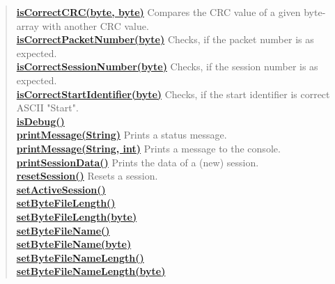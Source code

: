 {{{{{\begin{verse}
\hyperlink{filetransferUDP.FileTransfer.isCorrectCRC(byte[], byte[])}{{\bf isCorrectCRC(byte\lbrack \rbrack , byte\lbrack \rbrack )}} Compares the CRC value of a given byte-array with another CRC value.\\
\hyperlink{filetransferUDP.FileTransfer.isCorrectPacketNumber(byte)}{{\bf isCorrectPacketNumber(byte)}} Checks, if the packet number is as expected.\\
\hyperlink{filetransferUDP.FileTransfer.isCorrectSessionNumber(byte[])}{{\bf isCorrectSessionNumber(byte\lbrack \rbrack )}} Checks, if the session number is as expected.\\
\hyperlink{filetransferUDP.FileTransfer.isCorrectStartIdentifier(byte[])}{{\bf isCorrectStartIdentifier(byte\lbrack \rbrack )}} Checks, if the start identifier is correct ASCII "Start".\\
\hyperlink{filetransferUDP.FileTransfer.isDebug()}{{\bf isDebug()}} \\
\hyperlink{filetransferUDP.FileTransfer.printMessage(java.lang.String)}{{\bf printMessage(String)}} Prints a status message.\\
\hyperlink{filetransferUDP.FileTransfer.printMessage(java.lang.String, int)}{{\bf printMessage(String, int)}} Prints a message to the console.\\
\hyperlink{filetransferUDP.FileTransfer.printSessionData()}{{\bf printSessionData()}} Prints the data of a (new) session.\\
\hyperlink{filetransferUDP.FileTransfer.resetSession()}{{\bf resetSession()}} Resets a session.\\
\hyperlink{filetransferUDP.FileTransfer.setActiveSession()}{{\bf setActiveSession()}} \\
\hyperlink{filetransferUDP.FileTransfer.setByteFileLength()}{{\bf setByteFileLength()}} \\
\hyperlink{filetransferUDP.FileTransfer.setByteFileLength(byte[])}{{\bf setByteFileLength(byte\lbrack \rbrack )}} \\
\hyperlink{filetransferUDP.FileTransfer.setByteFileName()}{{\bf setByteFileName()}} \\
\hyperlink{filetransferUDP.FileTransfer.setByteFileName(byte[])}{{\bf setByteFileName(byte\lbrack \rbrack )}} \\
\hyperlink{filetransferUDP.FileTransfer.setByteFileNameLength()}{{\bf setByteFileNameLength()}} \\
\hyperlink{filetransferUDP.FileTransfer.setByteFileNameLength(byte[])}{{\bf setByteFileNameLength(byte\lbrack \rbrack )}} \\

\end{verse}}}}}}
